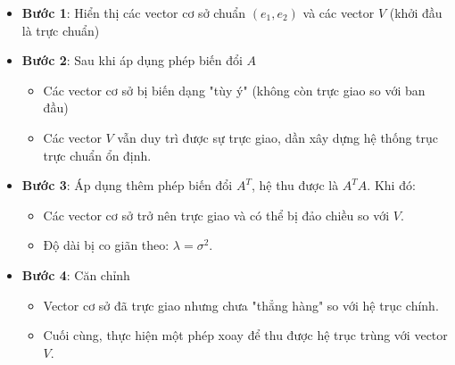 \begin{itemize}[topsep=0pt, itemsep=2.5pt, leftmargin=1.5cm]
    \item \textbf{Bước 1}: Hiển thị các vector cơ sở chuẩn $(e_1, e_2)$ và các vector $V$ (khởi đầu là trực chuẩn)
    \item \textbf{Bước 2}: Sau khi áp dụng phép biến đổi $A$
    \begin{itemize}[label=, leftmargin=1.5cm]
        \item Các vector cơ sở bị biến dạng "tùy ý" (không còn trực giao so với ban đầu)
        \item Các vector $V$ vẫn duy trì được sự trực giao, dần xây dựng hệ thống trục trực chuẩn ổn định.    
    \end{itemize}
    \item \textbf{Bước 3}: Áp dụng thêm phép biến đổi $A^T$, hệ thu được là $A^TA$. Khi đó:
    \begin{itemize}[label=, leftmargin=1.5cm]
        \item Các vector cơ sở trở nên trực giao và có thể bị đảo chiều so với $V$.
        \item Độ dài bị co giãn theo: $\lambda = \sigma^2$.  
    \end{itemize}
    \item \textbf{Bước 4}: Căn chỉnh
    \begin{itemize}[label=, leftmargin=1.5cm]
        \item Vector cơ sở đã trực giao nhưng chưa "thẳng hàng" so với hệ trục chính.
        \item Cuối cùng, thực hiện một phép xoay để thu được hệ trục trùng với vector $V$. 
    \end{itemize}
\end{itemize}

